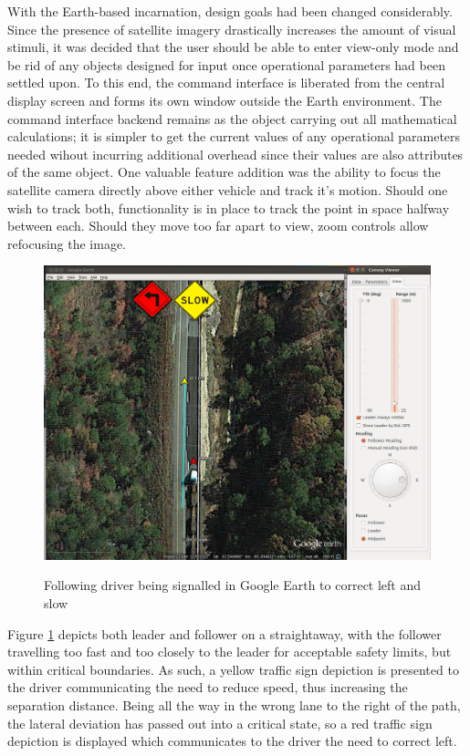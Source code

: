 \documentclass[12pt]{report}
\begin{document}
With the Earth-based incarnation, design goals had been changed considerably. Since the presence of satellite imagery drastically increases the amount of  visual stimuli, it was decided that the user should be able to enter view-only mode and be rid of any objects designed for input once operational parameters had been settled upon. To this end, the command interface is liberated from the central display screen and forms its own window outside the Earth environment. The command interface backend remains as the object carrying out all mathematical calculations; it is simpler to get the current values of any operational parameters needed wihout incurring additional overhead since their values are also attributes of the same object. One valuable feature addition was the ability to focus the satellite camera directly above either vehicle and track it's motion. Should one wish to track both, functionality is in place to track the point in space halfway between each. Should they move too far apart to view, zoom controls allow refocusing the image.

\begin{figure}[ht] \centering \label{fig:earth_dst}
    \includegraphics[width=5in]{./figs/earth_slow.png}
    \caption{Following driver being signalled in Google Earth to correct left and slow}
\end{figure}

Figure \ref{fig:earth_dst} depicts both leader and follower on a straightaway, with the follower travelling too fast and too closely to the leader for acceptable safety limits, but within critical boundaries. As such, a yellow traffic sign depiction is presented to the driver communicating the need to reduce speed, thus increasing the separation distance. Being all the way in the wrong lane to the right of the path, the lateral deviation has passed out into a critical state, so a red traffic sign depiction is displayed which communicates to the driver the need to correct left.
\end{document}
